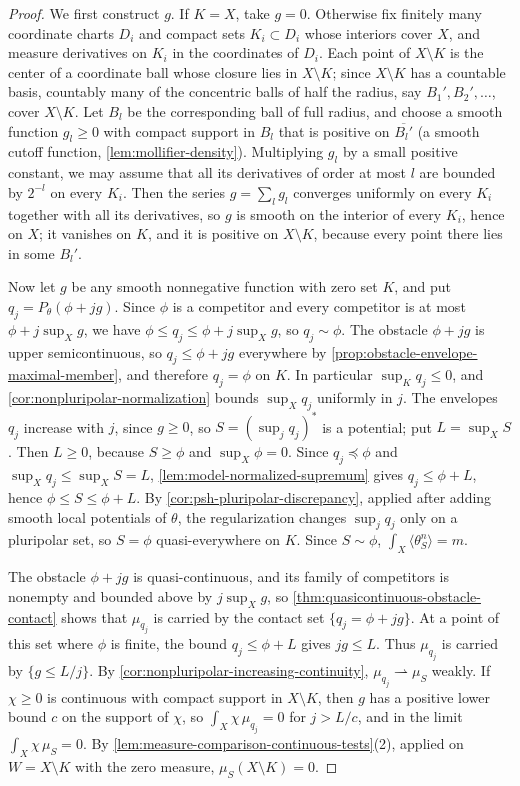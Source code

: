 \begin{proof}
We first construct $g$. If $K=X$, take $g=0$. Otherwise fix finitely many coordinate charts $D_i$ and compact sets $K_i\subset D_i$ whose interiors cover $X$, and measure derivatives on $K_i$ in the coordinates of $D_i$. Each point of $X\setminus K$ is the center of a coordinate ball whose closure lies in $X\setminus K$; since $X\setminus K$ has a countable basis, countably many of the concentric balls of half the radius, say $B_1',B_2',\ldots$, cover $X\setminus K$. Let $B_l$ be the corresponding ball of full radius, and choose a smooth function $g_l\geq0$ with compact support in $B_l$ that is positive on $\overline{B_l'}$ (a smooth cutoff function, \cref{lem:mollifier-density}). Multiplying $g_l$ by a small positive constant, we may assume that all its derivatives of order at most $l$ are bounded by $2^{-l}$ on every $K_i$. Then the series $g=\sum_lg_l$ converges uniformly on every $K_i$ together with all its derivatives, so $g$ is smooth on the interior of every $K_i$, hence on $X$; it vanishes on $K$, and it is positive on $X\setminus K$, because every point there lies in some $B_l'$.

Now let $g$ be any smooth nonnegative function with zero set $K$, and put $q_j=P_\theta(\phi+jg)$. Since $\phi$ is a competitor and every competitor is at most $\phi+j\sup_Xg$, we have $\phi\leq q_j\leq\phi+j\sup_Xg$, so $q_j\sim\phi$. The obstacle $\phi+jg$ is upper semicontinuous, so $q_j\leq\phi+jg$ everywhere by \cref{prop:obstacle-envelope-maximal-member}, and therefore $q_j=\phi$ on $K$. In particular $\sup_Kq_j\leq0$, and \cref{cor:nonpluripolar-normalization} bounds $\sup_Xq_j$ uniformly in $j$. The envelopes $q_j$ increase with $j$, since $g\geq0$, so $S=(\sup_jq_j)^*$ is a potential; put $L=\sup_XS$. Then $L\geq0$, because $S\geq\phi$ and $\sup_X\phi=0$. Since $q_j\preceq\phi$ and $\sup_Xq_j\leq\sup_XS=L$, \cref{lem:model-normalized-supremum} gives $q_j\leq\phi+L$, hence $\phi\leq S\leq\phi+L$. By \cref{cor:psh-pluripolar-discrepancy}, applied after adding smooth local potentials of $\theta$, the regularization changes $\sup_jq_j$ only on a pluripolar set, so $S=\phi$ quasi-everywhere on $K$. Since $S\sim\phi$, $\int_X\langle\theta_S^n\rangle=m$.

The obstacle $\phi+jg$ is quasi-continuous, and its family of competitors is nonempty and bounded above by $j\sup_Xg$, so \cref{thm:quasicontinuous-obstacle-contact} shows that $\mu_{q_j}$ is carried by the contact set $\{q_j=\phi+jg\}$. At a point of this set where $\phi$ is finite, the bound $q_j\leq\phi+L$ gives $jg\leq L$. Thus $\mu_{q_j}$ is carried by $\{g\leq L/j\}$. By \cref{cor:nonpluripolar-increasing-continuity}, $\mu_{q_j}\rightharpoonup\mu_S$ weakly. If $\chi\geq0$ is continuous with compact support in $X\setminus K$, then $g$ has a positive lower bound $c$ on the support of $\chi$, so $\int_X\chi\,\mu_{q_j}=0$ for $j>L/c$, and in the limit $\int_X\chi\,\mu_S=0$. By \cref{lem:measure-comparison-continuous-tests}(2), applied on $W=X\setminus K$ with the zero measure, $\mu_S(X\setminus K)=0$.


\end{proof}
